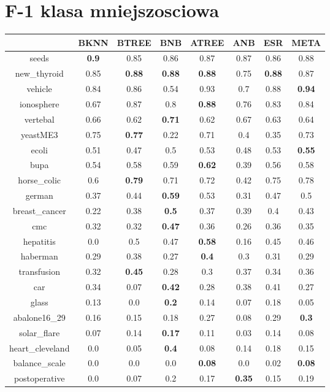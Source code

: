 \documentclass{article}%
\begin{document}
\section*{F{-}1 klasa mniejszosciowa}%
\begin{tabular}{c|ccccccc}%
\hline%
&BKNN&BTREE&BNB&ATREE&ANB&ESR&META\\%
\hline%
seeds&\textbf{0.9}&0.85&0.86&0.87&0.87&0.86&0.88\\%
new\_thyroid&0.85&\textbf{0.88}&\textbf{0.88}&\textbf{0.88}&0.75&\textbf{0.88}&0.87\\%
vehicle&0.84&0.86&0.54&0.93&0.7&0.88&\textbf{0.94}\\%
ionosphere&0.67&0.87&0.8&\textbf{0.88}&0.76&0.83&0.84\\%
vertebal&0.66&0.62&\textbf{0.71}&0.62&0.67&0.63&0.64\\%
yeastME3&0.75&\textbf{0.77}&0.22&0.71&0.4&0.35&0.73\\%
ecoli&0.51&0.47&0.5&0.53&0.48&0.53&\textbf{0.55}\\%
bupa&0.54&0.58&0.59&\textbf{0.62}&0.39&0.56&0.58\\%
horse\_colic&0.6&\textbf{0.79}&0.71&0.72&0.42&0.75&0.78\\%
german&0.37&0.44&\textbf{0.59}&0.53&0.31&0.47&0.5\\%
breast\_cancer&0.22&0.38&\textbf{0.5}&0.37&0.39&0.4&0.43\\%
cmc&0.32&0.32&\textbf{0.47}&0.36&0.26&0.36&0.35\\%
hepatitis&0.0&0.5&0.47&\textbf{0.58}&0.16&0.45&0.46\\%
haberman&0.29&0.38&0.27&\textbf{0.4}&0.3&0.31&0.29\\%
transfusion&0.32&\textbf{0.45}&0.28&0.3&0.37&0.34&0.36\\%
car&0.34&0.07&\textbf{0.42}&0.28&0.38&0.41&0.27\\%
glass&0.13&0.0&\textbf{0.2}&0.14&0.07&0.18&0.05\\%
abalone16\_29&0.16&0.15&0.18&0.27&0.08&0.29&\textbf{0.3}\\%
solar\_flare&0.07&0.14&\textbf{0.17}&0.11&0.03&0.14&0.08\\%
heart\_cleveland&0.0&0.05&\textbf{0.4}&0.08&0.14&0.18&0.15\\%
balance\_scale&0.0&0.0&0.0&\textbf{0.08}&0.0&0.02&\textbf{0.08}\\%
postoperative&0.0&0.07&0.2&0.17&\textbf{0.35}&0.15&0.19\\%
\end{tabular}
\end{document}
